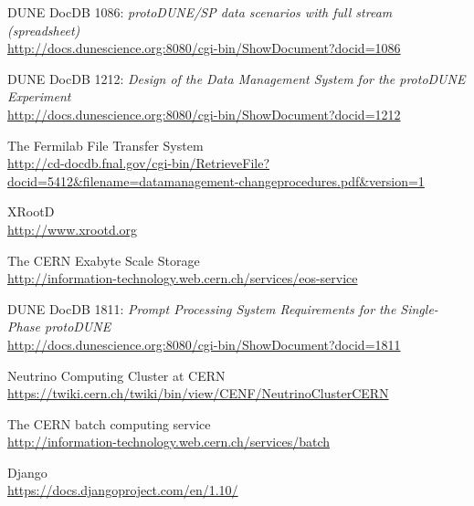 \documentclass[pdftex,12pt,letter]{article}
\begin{document}
\clearpage
\begin{thebibliography}{1}

{DUNE DocDB 1086: \textit{ protoDUNE/SP data scenarios with full stream (spreadsheet)}}\\
\url{http://docs.dunescience.org:8080/cgi-bin/ShowDocument?docid=1086}




{DUNE DocDB 1212: \textit{Design of the Data Management System for the protoDUNE Experiment}}\\
\url{http://docs.dunescience.org:8080/cgi-bin/ShowDocument?docid=1212}

{The Fermilab File Transfer System}\\
\url{http://cd-docdb.fnal.gov/cgi-bin/RetrieveFile?docid=5412&filename=datamanagement-changeprocedures.pdf&version=1}


{XRootD}\\
\url{http://www.xrootd.org}

{The CERN Exabyte Scale Storage}\\
\url{http://information-technology.web.cern.ch/services/eos-service}



{DUNE DocDB 1811: \textit{Prompt Processing System Requirements for the Single-Phase protoDUNE}}\\
\url{http://docs.dunescience.org:8080/cgi-bin/ShowDocument?docid=1811}



{Neutrino Computing Cluster at CERN}\\
\url{https://twiki.cern.ch/twiki/bin/view/CENF/NeutrinoClusterCERN}

{The CERN batch computing service}\\
\url{http://information-technology.web.cern.ch/services/batch}

{Django}\\
\url{https://docs.djangoproject.com/en/1.10/}


\end{thebibliography}
\end{document}
